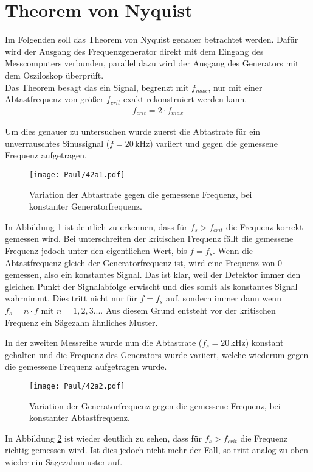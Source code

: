\section{Theorem von Nyquist}

Im Folgenden soll das Theorem von Nyquist genauer betrachtet werden. Dafür wird der Ausgang des Frequenzgenerator direkt mit dem Eingang des Messcomputers verbunden, parallel dazu wird der Ausgang des Generators mit dem Osziloskop überprüft.\\
Das Theorem besagt das ein Signal, begrenzt mit $f_{max}$, nur mit einer Abtastfrequenz von größer $f_{crit}$ exakt rekonstruiert werden kann.
\begin{align}
    f_{crit} = 2 \cdot f_{max}
\end{align}


Um dies genauer zu untersuchen wurde zuerst die Abtastrate für ein unverrauschtes Sinussignal ($f = 20$\,kHz) variiert und gegen die gemessene Frequenz aufgetragen.
\begin{figure}[h]
    \centering
    \texttt{[image: Paul/42a1.pdf]}
    \caption{Variation der Abtastrate gegen die gemessene Frequenz, bei konstanter Generatorfrequenz.}
    \label{fig:42a1}
\end{figure}

In Abbildung \ref{fig:42a1} ist deutlich zu erkennen, dass für $f_s > f_{crit}$ die Frequenz korrekt gemessen wird. Bei unterschreiten der kritischen Frequenz fällt die gemessene Frequenz jedoch unter den eigentlichen Wert, bis $f = f_s$. Wenn die Abtastfrequenz gleich der Generatorfrequenz ist, wird eine Frequenz von 0 gemessen, also ein konstantes Signal. Das ist klar, weil der Detektor immer den gleichen Punkt der Signalabfolge erwischt und dies somit als konstantes Signal wahrnimmt. Dies tritt nicht nur für $f = f_s$ auf, sondern immer dann wenn $f_s = n \cdot f$ mit $ n= 1,2,3...$. Aus diesem Grund entsteht vor der kritischen Frequenz ein Sägezahn ähnliches Muster.

\newpage
In der zweiten Messreihe wurde nun die Abtastrate ($f_s = 20$\,kHz) konstant gehalten und die Frequenz des Generators wurde variiert, welche wiederum gegen die gemessene Frequenz aufgetragen wurde.
\begin{figure}[h]
    \centering
    \texttt{[image: Paul/42a2.pdf]}
    \caption{Variation der Generatorfrequenz gegen die gemessene Frequenz, bei konstanter Abtastfrequenz.}
    \label{fig:42a2}
\end{figure}
In Abbildung \ref{fig:42a2} ist wieder deutlich zu sehen, dass für $f_s > f_{crit}$ die Frequenz richtig gemessen wird. Ist dies jedoch nicht mehr der Fall, so tritt analog zu oben wieder ein Sägezahnmuster auf.


